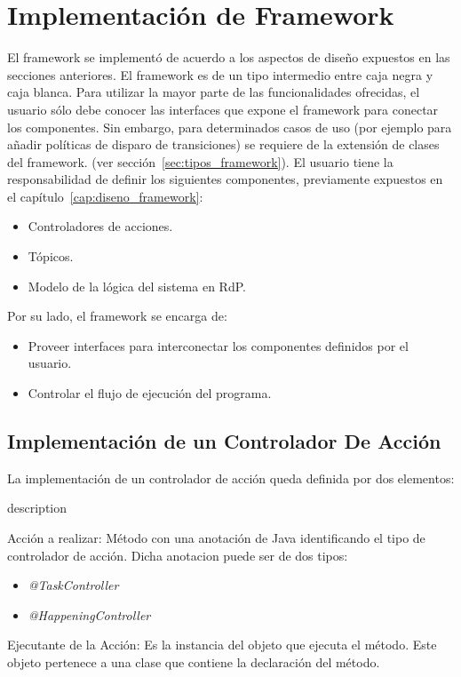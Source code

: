 \section{Implementación de \nombreFramework Framework}
El framework se implementó de acuerdo a los aspectos de diseño expuestos en
las secciones anteriores. El framework es de un tipo intermedio entre caja negra
y caja blanca. Para utilizar la mayor parte de las funcionalidades ofrecidas, el
usuario sólo debe conocer las interfaces que expone el framework para conectar
los componentes. Sin embargo, para determinados casos de uso (por ejemplo para
añadir políticas de disparo de transiciones) se requiere de la extensión de
clases del framework.
(ver sección~\ref{sec:tipos_framework}).
El usuario tiene la responsabilidad de definir los siguientes componentes,
previamente expuestos en el capítulo~\ref{cap:diseno_framework}:
\begin{itemize} 
  \item Controladores de acciones.
  \item Tópicos.
  \item Modelo de la lógica del sistema en RdP.
\end{itemize}

Por su lado, el framework se encarga de:
\begin{itemize} 
  \item Proveer interfaces para interconectar los componentes definidos por el
  usuario.
  \item Controlar el flujo de ejecución del programa.
\end{itemize}

\subsection{Implementación de un Controlador De Acción}
\label{sec:implementacion_controlador_accion}
La implementación de un controlador de acción queda definida por dos elementos:
\begin{labeling}{description}
  \item [Acción a realizar: ] Método con una anotación de Java
  identificando el tipo de controlador de acción. 
  Dicha anotacion puede ser de dos tipos:
  \begin{itemize}
    \item \emph{@TaskController}
    \item \emph{@HappeningController}
  \end{itemize}
  \item [Ejecutante de la Acción: ] Es la instancia del objeto que ejecuta el
  método. Este objeto pertenece a una clase que contiene la declaración
  del método.
\end{labeling}

